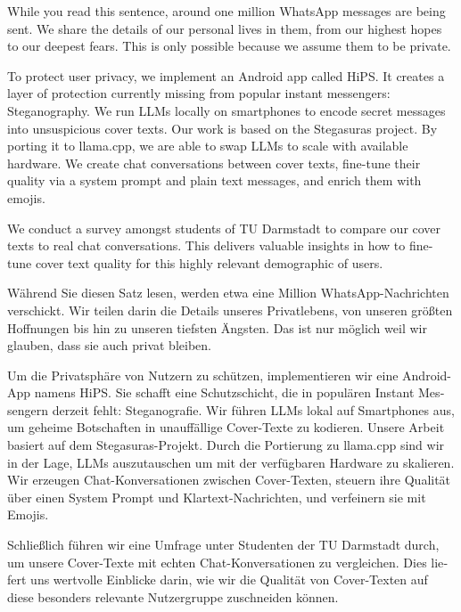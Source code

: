 
\begingroup
\let\clearpage\relax
\let\cleardoublepage\relax
\let\cleardoublepage\relax

While you read this sentence, around one million WhatsApp messages are being sent. We share the details of our personal lives in them, from our highest hopes to our deepest fears. This is only possible because we assume them to be private.

To protect user privacy, we implement an Android app called \gls{HiPS}. It creates a layer of protection currently missing from popular instant messengers: Steganography. We run \glspl{LLM} locally on smartphones to encode secret messages into unsuspicious cover texts. Our work is based on the Stegasuras project. By porting it to llama.cpp, we are able to swap \glspl{LLM} to scale with available hardware. We create chat conversations between cover texts, fine-tune their quality via a system prompt and plain text messages, and enrich them with emojis.

We conduct a survey amongst students of TU Darmstadt to compare our cover texts to real chat conversations. This delivers valuable insights in how to fine-tune cover text quality for this highly relevant demographic of users.

\vfill

\begin{otherlanguage}{ngerman}
Während Sie diesen Satz lesen, werden etwa eine Million WhatsApp-Nachrichten verschickt. Wir teilen darin die Details unseres Privatlebens, von unseren größten Hoffnungen bis hin zu unseren tiefsten Ängsten. Das ist nur möglich weil wir glauben, dass sie auch privat bleiben.

Um die Privatsphäre von Nutzern zu schützen, implementieren wir eine Android-App namens \gls{HiPS}. Sie schafft eine Schutzschicht, die in populären Instant Messengern derzeit fehlt: Steganografie. Wir führen \glspl{LLM} lokal auf Smartphones aus, um geheime Botschaften in unauffällige Cover-Texte zu kodieren. Unsere Arbeit basiert auf dem Stegasuras-Projekt. Durch die Portierung zu llama.cpp sind wir in der Lage, \glspl{LLM} auszutauschen um mit der verfügbaren Hardware zu skalieren. Wir erzeugen Chat-Konversationen zwischen Cover-Texten, steuern ihre Qualität über einen System Prompt und Klartext-Nachrichten, und verfeinern sie mit Emojis.

Schließlich führen wir eine Umfrage unter Studenten der TU Darmstadt durch, um unsere Cover-Texte mit echten Chat-Konversationen zu vergleichen. Dies liefert uns wertvolle Einblicke darin, wie wir die Qualität von Cover-Texten auf diese besonders relevante Nutzergruppe zuschneiden können.
\end{otherlanguage}

\endgroup

\vfill
